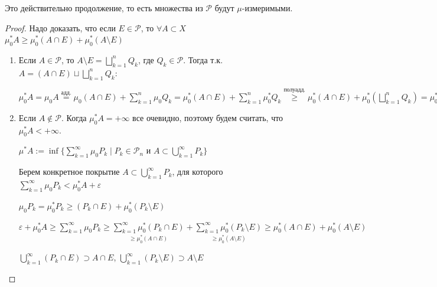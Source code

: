 \begin{theorem}
    Это действительно продолжение, то есть множества из $\mathcal{P}$ будут $\mu$-измеримыми.
\end{theorem}

\begin{proof}
    Надо доказать, что если $E\in \mathcal{P}$, то $\forall A\subset X$ $\mu_0^* A \geq \mu_0^* (A\cap E)+\mu_0^* (A\setminus E)$

    \begin{enumerate}
        \item Если $A\in \mathcal{P}$, то $A\setminus E =\bigsqcup \limits_{k=1}^n Q_k$, где $Q_k\in \mathcal{P}$. 
        Тогда т.к. $A=(A\cap E)\sqcup \bigsqcup \limits_{k=1}^n Q_k$:

        $\mu_0^* A = \mu_0 A \overset{\text{адд.}}{=}\mu_0(A\cap E)+\sum \limits_{k=1}^n \mu_0 Q_k=\mu^*_0(A\cap E)+\sum \limits_{k=1}^n \mu^*_0 Q_k
        \overset{\text{полуадд.}}{\geq} \mu_0^* (A\cap E)+\mu_0^* (\bigsqcup \limits_{k=1}^n Q_k)= \mu_0^* (A\cap E)+\mu_0^* (A\setminus E)$

        \item Если $A\not\in \mathcal{P}$. Когда $\mu_0^* A=+\infty$ все очевидно, поэтому будем считать, что $\mu_0^* A<+\infty$.
        
        $\mu^* A:=\inf \{\sum\limits_{k=1}^\infty \mu_0 P_k\mid P_k\in \mathcal{P}_n\text{ и } A\subset \bigcup\limits_{k=1}^\infty P_k\}$

        Берем конкретное покрытие $A\subset \bigcup\limits_{k=1}^\infty P_k$, для которого $\sum \limits_{k=1}^\infty \mu_0 P_k<\mu_0^* A+\varepsilon$

        $\mu_0 P_k = \mu_0^* P_k \geq (P_k \cap E) + \mu_0^* (P_k \setminus E)$

        $\varepsilon+\mu_0^* A\geq \sum \limits_{k=1}^\infty \mu_0 P_k\geq \underset{\geq \mu_0^* (A\cap E)}{\sum \limits_{k=1}^\infty \mu_0^* (P_k\cap E)}+
        \underset{\geq \mu_0^* (A\setminus E)}{\sum \limits_{k=1}^\infty \mu_0^* (P_k\setminus E)}\geq \mu_0^* (A\cap E)+\mu_0^* (A\setminus E)$

        $\bigcup\limits_{k=1}^\infty (P_k\cap E)\supset A \cap E$, $\bigcup\limits_{k=1}^\infty (P_k\setminus E)\supset A \setminus E$
    \end{enumerate}
\end{proof}

